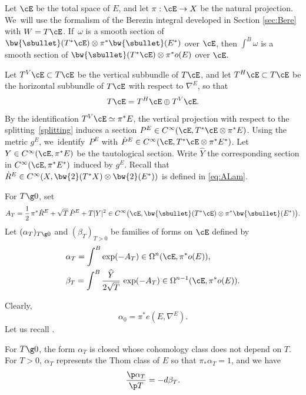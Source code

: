 Let $\cE$ be the total space of $E$, and let $\pi: \cE\to X$ be the
natural projection. We~will use the formalism of the Berezin integral developed in
Section \ref{sec:Bere} with $W = T\cE$. If~$\omega$ is a smooth section of
$\bw{\sbullet}(T^{*}\cE)\otimes\pi^{*}\bw{\sbullet}(E^{*})$
over $\cE$, then $\int^{B}\omega$ is a smooth section of $\bw{\sbullet}
(T^{*} \cE)
\otimes \pi^{*}o(E)$ over $\cE$.

Let $T^{V}\cE\subset T\cE$ be the vertical subbundle of $T\cE$, and
let $T^{H}\cE\subset T\cE$ be the horizontal subbundle of $T\cE$
with respect to $\nabla^{E}$, so that
\begin{equation}\label{splitting}
T\cE=T^{H}\cE\oplus T^{V}\cE.
\end{equation}
By the identification
$T^{V}\cE\simeq \pi^{*}E$,
the
vertical projection with
respect to the splitting~\eqref{splitting} induces a section
$P^{E}\in C^{\infty}(\cE,T^{*}\cE \otimes \pi^{*}E)$. Using the metric $g^{E}$, we~iden\-tify~$P^{E}$ with $\dot{P}^{E}\in C^{\infty}(\cE,T^{*}\cE \otimes \pi^{*}E^{*})$.
Let $Y\in C^{\infty}(\cE,\pi^{*}E)$ be the tautological section.
Write $\widehat{Y}$ the corresponding section in
$C^{\infty}(\cE,\pi^{*}E^{*})$ induced by $g^{E}$.
Recall that $\dot{R}^{E}\in C^{\infty}(X,\bw{2}(T^{*}X)\otimes \bw{2}(E^{*}))$ is
defined in \eqref{eq:ALam}.

\begin{defin}
For
$T\g 0$, set
\begin{equation*}
A_{T}=\frac{1}{2}\,\pi^{*}\dot{R}^{E}+\sqrt{T}\,\dot{P}^{E}+T|Y|^{2}\in C^{\infty}\big(\cE,\bw{\sbullet}(T^{*}\cE)\otimes \pi^{*}\bw{\sbullet}(E^{*})\big).
\end{equation*}
Let $(\alpha_{T})_{T\g0}$ and $(\beta_{T})_{T>0}$ be families of forms on $\cE$ defined
by
\begin{equation}\label{eqDang1}
\begin{aligned}
&\alpha_{T}=\int^{B}\exp(-A_{T})\in
\Omega^{n}(\cE,\pi^{*}o(E)),\\
&\beta_{T}=\int^{B}\frac{\widehat{Y}}{2\sqrt{T}}\,\exp(-A_{T})\in \Omega^{n-1}(\cE,\pi^{*}o(E)).
\end{aligned}
\end{equation}
\end{defin}
Clearly,
\begin{equation*}
\alpha_{0}=\pi^{*}e(E,\nabla^{E}).
\end{equation*}
Let us recall \cite[Th.\,3.4, 3.5, \& 3.7]{BZ92}.
\begin{thm}
For $T\g 0$, the form $\alpha_{T}$ is closed whose cohomology class
does not depend on $T$.
For $T>0$, $\alpha_{T}$ represents the Thom
class of $E$ so that $\pi_{*}\alpha_{T}=1$, and we have
\begin{equation*}
\frac{\p \alpha_{T}}{\p T}=-d\beta_{T}.
\end{equation*}
\end{thm}

